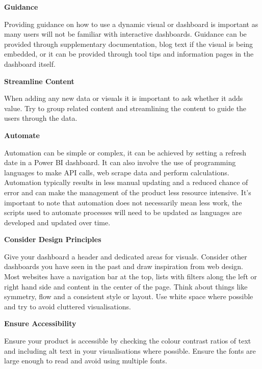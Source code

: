 \documentclass[
]{book}
\begin{document}
\textbf{Guidance}

Providing guidance on how to use a dynamic visual or dashboard is important as many users will not be familiar with interactive dashboards. Guidance can be provided through supplementary documentation, blog text if the visual is being embedded, or it can be provided through tool tips and information pages in the dashboard itself.

\textbf{Streamline Content}

When adding any new data or visuals it is important to ask whether it adds value. Try to group related content and streamlining the content to guide the users through the data.

\textbf{Automate }

Automation can be simple or complex, it can be achieved by setting a refresh date in a Power BI dashboard. It can also involve the use of programming languages to make API calls, web scrape data and perform calculations. Automation typically results in less manual updating and a reduced chance of error and can make the management of the product less resource intensive. It's important to note that automation does not necessarily mean less work, the scripts used to automate processes will need to be updated as languages are developed and updated over time.

\textbf{Consider Design Principles}

Give your dashboard a header and dedicated areas for visuals. Consider other dashboards you have seen in the past and draw inspiration from web design. Most websites have a navigation bar at the top, lists with filters along the left or right hand side and content in the center of the page. Think about things like symmetry, flow and a consistent style or layout. Use white space where possible and try to avoid cluttered visualisations.

\textbf{Ensure Accessibility}

Ensure your product is accessible by checking the colour contrast ratios of text and including alt text in your visualisations where possible. Ensure the fonts are large enough to read and avoid using multiple fonts.

  
\end{document}
